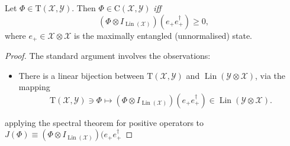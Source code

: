 \documentclass[12pt]{report}
\newcommand{\calY}{{\mathcal{Y}}}
\newcommand{\calX}{{\mathcal{X}}}
\newcommand{\rmC}{{\mathrm{C}}}
\newcommand{\rmT}{{\mathrm{T}}}
\DeclareMathOperator{\Lin}{Lin}
\begin{document}
\begin{prop}
	Let $\Phi\in\rmT(\calX,\calY)$. Then $\Phi\in\rmC(\calX,\calY)$ \emph{iff}
	\begin{equation}
		(\Phi\otimes I_{\Lin(\calX)})(e_+ e_+^\dagger)\ge0,
	\end{equation}
	where $e_+\in\calX\otimes\calX$ is the maximally entangled (unnormalised) state.
\end{prop}


\begin{proof}
	The standard argument involves the observations:
	\begin{itemize}
		\item There is a linear bijection between $\rmT(\calX,\calY)$ and $\Lin(\calY\otimes\calX)$, via the mapping
		\begin{equation}
			\rmT(\calX,\calY)\ni \Phi\mapsto (\Phi\otimes I_{\Lin(\calX)})(e_+ e_+^\dagger)\in\Lin(\calY\otimes\calX).
		\end{equation}
	\end{itemize}
	 applying the spectral theorem for positive operators to
	$J(\Phi)\equiv (\Phi\otimes I_{\Lin(\calX)})(e_+ e_+^\dagger$
\end{proof}
\end{document}
